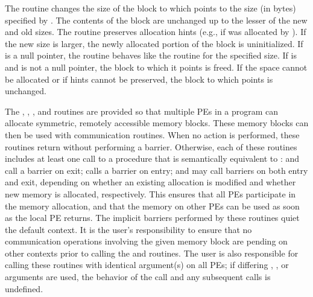 \begin{apidefinition}
{    The  routine changes the size of the block to which
     points to the size (in bytes) specified by .  The contents
    of the block are unchanged up to the lesser of the new and old sizes.
	The  routine preserves allocation hints (e.g., if 
	was allocated by ).
	If the new size is larger, the newly allocated portion of the block is
    uninitialized.  If  is a null pointer, the
     routine behaves like the  routine for
    the specified size.  If  is  and  is not a
    null pointer, the block to which it points is freed. If the space cannot
    be allocated or if hints cannot be preserved, the block to which 
	points is unchanged.
    
    The , , , and  routines
    are provided  so that multiple \acp{PE} in a program can allocate symmetric,
    remotely accessible memory blocks.  These memory blocks can then be used with
    \openshmem communication routines.  When no action is performed, these
    routines return without performing a barrier.
    Otherwise, each of these routines includes at least one
    call to a procedure that is semantically equivalent to :
     and  call a
    barrier on exit;  calls a barrier on entry; and
     may call barriers on both entry and exit, depending on
    whether an existing allocation is modified and whether new memory is allocated, respectively.
    This ensures that all
    \acp{PE} participate in the memory allocation, and that the memory on other
    \acp{PE} can be used as soon as the local \ac{PE} returns.
    The implicit barriers performed by these routines quiet the
    default context.  It is the user's responsibility to ensure that no
    communication operations involving the given memory block are pending on
    other contexts prior to calling
    the  and  routines.
    The user is also
    responsible for calling these routines with identical argument(s) on all
    \acp{PE}; if differing , , or  arguments are used, the behavior of the call
    and any subsequent \openshmem calls is undefined.
}

\end{apidefinition}
